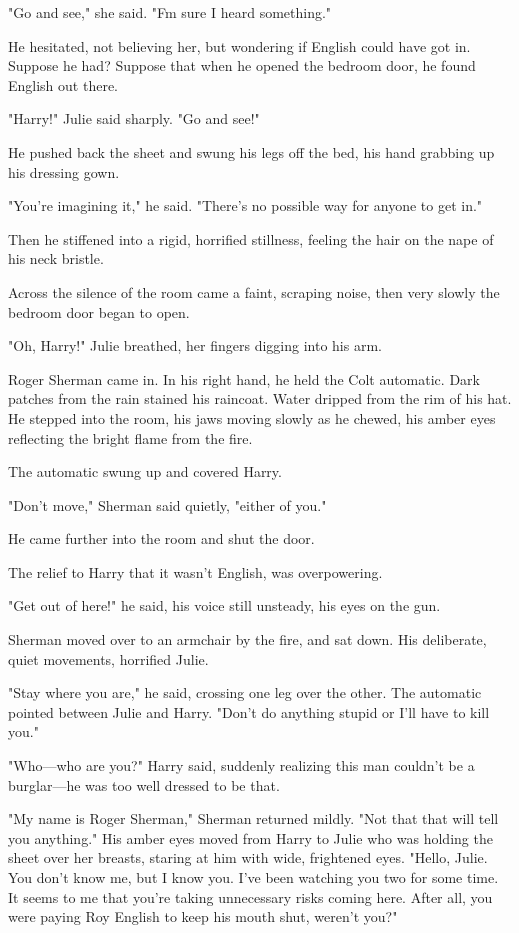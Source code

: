 \documentclass{novel}
\begin{document}
"Go and see," she said. "Fm sure I heard something."

He hesitated, not believing her, but wondering if English could have got in. Suppose he had? Suppose that when he opened the bedroom door, he found English out there.

"Harry!" Julie said sharply. "Go and see!"

He pushed back the sheet and swung his legs off the bed, his hand grabbing up his dressing gown.

"You're imagining it," he said. "There's no possible way for anyone to get in."

Then he stiffened into a rigid, horrified stillness, feeling the hair on the nape of his neck bristle.

Across the silence of the room came a faint, scraping noise, then very slowly the bedroom door began to open.

"Oh, Harry!" Julie breathed, her fingers digging into his arm.

Roger Sherman came in. In his right hand, he held the Colt automatic. Dark patches from the rain stained his raincoat. Water dripped from the rim of his hat. He stepped into the room, his jaws moving slowly as he chewed, his amber eyes reflecting the bright flame from the fire.

The automatic swung up and covered Harry.

"Don't move," Sherman said quietly, "either of you."

He came further into the room and shut the door.

The relief to Harry that it wasn't English, was overpowering.

"Get out of here!" he said, his voice still unsteady, his eyes on the gun.

Sherman moved over to an armchair by the fire, and sat down. His deliberate, quiet movements, horrified Julie.

"Stay where you are," he said, crossing one leg over the other. The automatic pointed between Julie and Harry. "Don't do anything stupid or I'll have to kill you."

"Who—who are you?" Harry said, suddenly realizing this man couldn't be a burglar—he was too well dressed to be that.

"My name is Roger Sherman," Sherman returned mildly. "Not that that will tell you anything." His amber eyes moved from Harry to Julie who was holding the sheet over her breasts, staring at him with wide, frightened eyes. "Hello, Julie. You don't know me, but I know you. I've been watching you two for some time. It seems to me that you're taking unnecessary risks coming here. After all, you were paying Roy English to keep his mouth shut, weren't you?"
\end{document}
